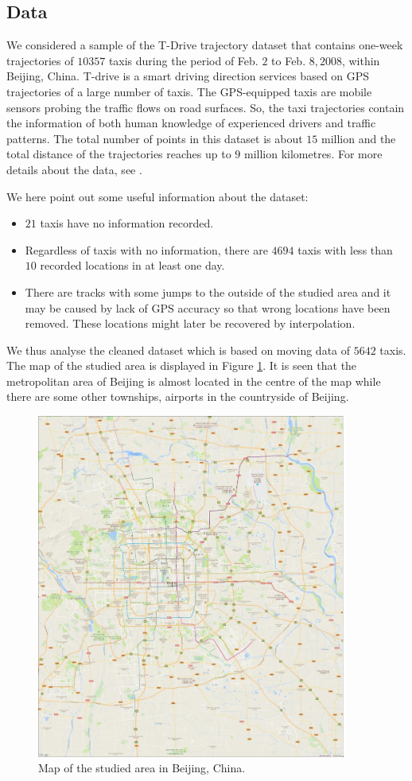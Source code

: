 \documentclass[article]{jss}
\begin{document}
\subsection{Data}
 We considered a sample of the T-Drive trajectory dataset that contains one-week trajectories of $10357$ taxis during the period of Feb. $2$ to Feb. $8, 2008$, within Beijing, China. T-drive is a smart driving direction services based on GPS trajectories of a large number of taxis. The GPS-equipped taxis are mobile sensors probing the traffic flows on road surfaces. So, the taxi trajectories contain the information of both human knowledge of experienced drivers and traffic patterns. The total number of points in this dataset is about $15$ million and the total distance of the trajectories reaches up to $9$ million kilometres. For more details about the data, see \cite{yuan10,yuan11}. 
  
We here point out some useful information about the dataset:
\begin{itemize}
  \item $21$ taxis have no information recorded.
  \item Regardless of taxis with no information, there are $4694$ taxis with less than $10$ recorded locations in at least one day. 
  \item There are tracks with some jumps to the outside of the studied area and it may be caused by lack of GPS accuracy so that wrong locations have been removed. These locations might later be recovered by interpolation.
\end{itemize}
  We thus analyse the cleaned dataset which is based on moving data of $5642$ taxis. The map of the studied area is displayed in Figure \ref{Beijingmapgoogle}. It is seen that the metropolitan area of Beijing is almost located in the centre of the map while there are some other townships, airports in the countryside of Beijing.
  \begin{figure}[!h]
  \centering
  \includegraphics[width = 4in]{Beijingmap}
  \caption{Map of the studied area in Beijing, China.}
  \label{Beijingmapgoogle}
  \end{figure}
  
\end{document}
